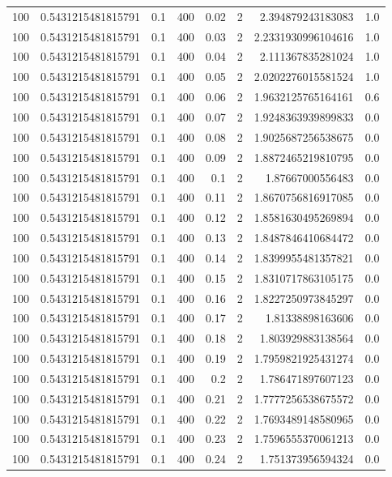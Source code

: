 \documentclass[11pt]{article}
\begin{document}
\begin{center}
\begin{tabular}{rrrrrrrr}
100 & 0.5431215481815791 & 0.1 & 400 & 0.02 & 2 & 2.394879243183083 & 1.0\\
100 & 0.5431215481815791 & 0.1 & 400 & 0.03 & 2 & 2.2331930996104616 & 1.0\\
100 & 0.5431215481815791 & 0.1 & 400 & 0.04 & 2 & 2.111367835281024 & 1.0\\
100 & 0.5431215481815791 & 0.1 & 400 & 0.05 & 2 & 2.0202276015581524 & 1.0\\
100 & 0.5431215481815791 & 0.1 & 400 & 0.06 & 2 & 1.9632125765164161 & 0.6\\
100 & 0.5431215481815791 & 0.1 & 400 & 0.07 & 2 & 1.9248363939899833 & 0.0\\
100 & 0.5431215481815791 & 0.1 & 400 & 0.08 & 2 & 1.9025687256538675 & 0.0\\
100 & 0.5431215481815791 & 0.1 & 400 & 0.09 & 2 & 1.8872465219810795 & 0.0\\
100 & 0.5431215481815791 & 0.1 & 400 & 0.1 & 2 & 1.87667000556483 & 0.0\\
100 & 0.5431215481815791 & 0.1 & 400 & 0.11 & 2 & 1.8670756816917085 & 0.0\\
100 & 0.5431215481815791 & 0.1 & 400 & 0.12 & 2 & 1.8581630495269894 & 0.0\\
100 & 0.5431215481815791 & 0.1 & 400 & 0.13 & 2 & 1.8487846410684472 & 0.0\\
100 & 0.5431215481815791 & 0.1 & 400 & 0.14 & 2 & 1.8399955481357821 & 0.0\\
100 & 0.5431215481815791 & 0.1 & 400 & 0.15 & 2 & 1.8310717863105175 & 0.0\\
100 & 0.5431215481815791 & 0.1 & 400 & 0.16 & 2 & 1.8227250973845297 & 0.0\\
100 & 0.5431215481815791 & 0.1 & 400 & 0.17 & 2 & 1.81338898163606 & 0.0\\
100 & 0.5431215481815791 & 0.1 & 400 & 0.18 & 2 & 1.803929883138564 & 0.0\\
100 & 0.5431215481815791 & 0.1 & 400 & 0.19 & 2 & 1.7959821925431274 & 0.0\\
100 & 0.5431215481815791 & 0.1 & 400 & 0.2 & 2 & 1.786471897607123 & 0.0\\
100 & 0.5431215481815791 & 0.1 & 400 & 0.21 & 2 & 1.7777256538675572 & 0.0\\
100 & 0.5431215481815791 & 0.1 & 400 & 0.22 & 2 & 1.7693489148580965 & 0.0\\
100 & 0.5431215481815791 & 0.1 & 400 & 0.23 & 2 & 1.7596555370061213 & 0.0\\
100 & 0.5431215481815791 & 0.1 & 400 & 0.24 & 2 & 1.751373956594324 & 0.0\\

\end{tabular}
\end{center}
\end{document}
